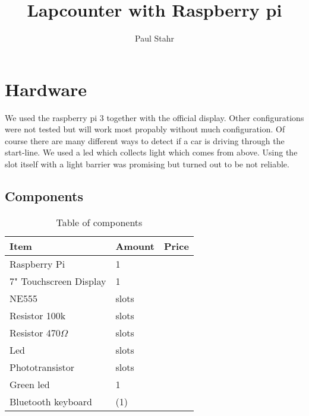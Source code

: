 \documentclass[11pt, a4paper, UKenglish, parskip=half+]{scrbook}
\author{Paul Stahr}
\title{Lapcounter with Raspberry pi}
\newcommand{\slots}{slots}
\begin{document}
\maketitle
\chapter{Hardware}
We used the raspberry pi 3 together with the official display. Other configurations were not tested but will work most propably without much configuration. Of course there are many different ways to detect if a car is driving through the start-line. We used a led which collects light which comes from above. Using the slot itself with a light barrier was promising but turned out to be not reliable.
\section{Components}
\begin{table}[H]
\begin{tabular}{l l l}
Item& Amount & Price\\\hline
Raspberry Pi & 1\\
7" Touchscreen Display & 1\\
NE555 & \slots \\
Resistor 100k & \slots \\
Resistor 470$\Omega$ & \slots \\
Led & \slots \\
Phototransistor & \slots\\
Green led & 1\\
Bluetooth keyboard & (1) \\
\end{tabular}
\caption{Table of components}
\end{table}

\end{document}

